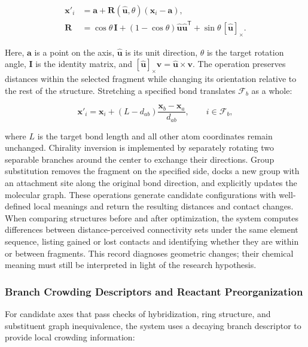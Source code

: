 \begin{equation}\label{eq:methods-2}
\begin{aligned}
\mathbf x'_i&=\mathbf a+\mathbf R(\hat{\mathbf u},\theta)(\mathbf x_i-\mathbf a),\\
\mathbf R&=\cos\theta\,\mathbf I+(1-\cos\theta)\hat{\mathbf u}\hat{\mathbf u}^{\mathsf T}
+\sin\theta\,[\hat{\mathbf u}]_\times .
\end{aligned}
\end{equation}

Here, $\mathbf a$ is a point on the axis, $\hat{\mathbf u}$ is its unit direction, $\theta$ is the target rotation angle, $\mathbf I$ is the identity matrix, and $[\hat{\mathbf u}]_\times\mathbf v=\hat{\mathbf u}\times\mathbf v$. The operation preserves distances within the selected fragment while changing its orientation relative to the rest of the structure. Stretching a specified bond translates $\mathcal F_b$ as a whole:

\begin{equation}\label{eq:methods-3}
\mathbf x'_i=\mathbf x_i+(L-d_{ab})\frac{\mathbf x_b-\mathbf x_a}{d_{ab}},\qquad i\in\mathcal F_b,
\end{equation}

where $L$ is the target bond length and all other atom coordinates remain unchanged. Chirality inversion is implemented by separately rotating two separable branches around the center to exchange their directions. Group substitution removes the fragment on the specified side, docks a new group with an attachment site along the original bond direction, and explicitly updates the molecular graph. These operations generate candidate configurations with well-defined local meanings and return the resulting distances and contact changes. When comparing structures before and after optimization, the system computes differences between distance-perceived connectivity sets under the same element sequence, listing gained or lost contacts and identifying whether they are within or between fragments. This record diagnoses geometric changes; their chemical meaning must still be interpreted in light of the research hypothesis.

\subsubsection{Branch Crowding Descriptors and Reactant Preorganization}

For candidate axes that pass checks of hybridization, ring structure, and substituent graph inequivalence, the system uses a decaying branch descriptor to provide local crowding information:


